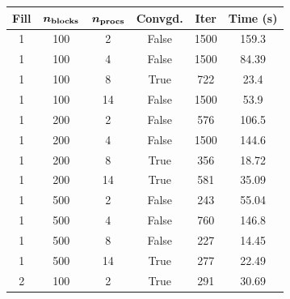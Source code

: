 \begin{table}[H]
	\centering
  \footnotesize
	\begin{tabular}{cccccc}
		\toprule
		\textbf{Fill} & \textbf{$\bm {n_{\rm blocks}}$} & \textbf{$\bm{n_{\rm procs}}$} & \textbf{Convgd.} & \textbf{Iter} & \textbf{Time (s)} \\
		\midrule
		1             & 100                             & 2                        & False            & 1500          & 159.3             \\
		1             & 100                             & 4                        & False            & 1500          & 84.39             \\
		1             & 100                             & 8                        & True             & 722           & 23.4              \\
		1             & 100                             & 14                       & False            & 1500          & 53.9              \\
		1             & 200                             & 2                        & False            & 576           & 106.5             \\
		1             & 200                             & 4                        & False            & 1500          & 144.6             \\
		1             & 200                             & 8                        & True             & 356           & 18.72             \\
		1             & 200                             & 14                       & True             & 581           & 35.09             \\
		1             & 500                             & 2                        & False            & 243           & 55.04             \\
		1             & 500                             & 4                        & False            & 760           & 146.8             \\
		1             & 500                             & 8                        & False            & 227           & 14.45             \\
		1             & 500                             & 14                       & True             & 277           & 22.49             \\
		\midrule
		2             & 100                             & 2                        & True             & 291           & 30.69             \\

\end{tabular}
\end{table}
